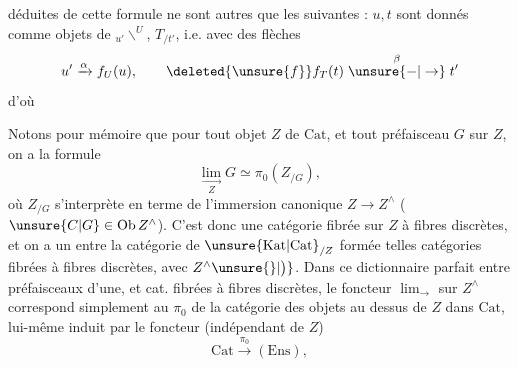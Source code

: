 déduites de cette formule ne sont autres que 
les suivantes : $u,t$ sont donnés comme objets de
$\mathord{}_{u'}\backslash^{U}$, $T_{/t'}$, i.e. avec des flèches
\[
u'\xrightarrow{\alpha}f_U(u),\qquad
\deleted{\unsure{f}}f_T(t)\mathrel{\overset{\beta}{\unsure{-|\to}}}t'
\]
d'où

Notons pour mémoire que pour tout
objet $Z$ de $\mathrm{Cat}$, et tout préfaisceau $G$
sur $Z$, on a la formule
\[
\underset{Z}{\lim_{\rightarrow}}G\simeq\pi_0(Z_{/G}),
\]
où $Z_{/G}$ s'interprète en terme de l'immersion
canonique $Z\longrightarrow Z^\wedge$ ($\unsure{C|G}\in\operatorname{Ob}Z^\wedge$).
C'est donc une catégorie fibrée sur $Z$ à fibres
discrètes, \unsure{\{}et on a  un  entre la
 catégorie  de $\unsure{\mathrm{Kat}|\mathrm{Cat}}_{/Z}$ formée  telles catégories
fibrées à fibres discrètes, avec $Z^\wedge\unsure{\}|\big)}$.
Dans ce dictionnaire parfait entre préfaisceaux
d'une, et cat. fibrées à fibres discrètes,
le foncteur $\lim_{\rightarrow}$ sur $Z^\wedge$ correspond simplement
au  $\pi_0$  de la catégorie des objets au
dessus de $Z$ dans $\mathrm{Cat}$, lui-même induit
par le foncteur (indépendant de $Z$)
\[
\mathrm{Cat}\xrightarrow{\pi_0}(\mathrm{Ens}),
\]
